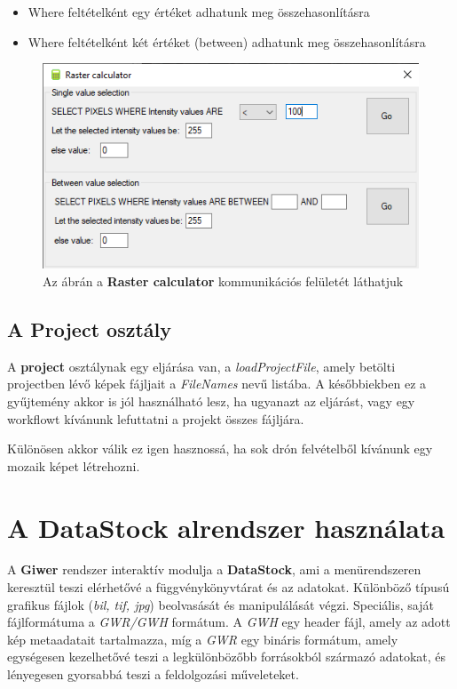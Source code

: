 \documentclass[a4paper,12pt]{article}
\begin{document}
\begin{itemize}
	\item Where feltételként egy értéket adhatunk meg összehasonlításra
	\item Where feltételként két értéket (between) adhatunk meg összehasonlításra
\end{itemize}
	
\begin{figure}
	\centering
	\includegraphics[width=12 cm]{rastcalc1.png}
	\caption{Az ábrán a \textbf{Raster calculator} kommunikációs felületét láthatjuk }
	\label{fig:rastcalc1}
\end{figure}	

\subsection{A \textbf{Project} osztály}

A \textbf{project} osztálynak egy eljárása van, a \textit{loadProjectFile}, amely betölti projectben lévő képek fájljait a \textit{FileNames} nevű listába. A későbbiekben ez a gyűjtemény akkor is jól használható lesz, ha ugyanazt az eljárást, vagy egy workflowt kívánunk lefuttatni a projekt összes fájljára.

Különösen akkor válik ez igen hasznossá, ha sok drón felvételből kívánunk egy mozaik képet létrehozni.


\section{A DataStock alrendszer használata}

A \textbf{Giwer} rendszer interaktív modulja a \textbf{DataStock}, ami a menürendszeren keresztül teszi elérhetővé a függvénykönyvtárat és az adatokat. Különböző típusú grafikus fájlok (\textit{bil, tif, jpg}) beolvasását és manipulálását végzi. Speciális, saját fájlformátuma a \textit{GWR/GWH} formátum. A \textit{GWH} egy header fájl, amely az adott kép metaadatait tartalmazza, míg a \textit{GWR} egy bináris formátum, amely egységesen kezelhetővé teszi a legkülönbözőbb forrásokból származó adatokat, és lényegesen gyorsabbá teszi a feldolgozási műveleteket.
\end{document}
